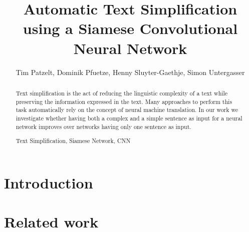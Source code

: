 \documentclass[runningheads,a4paper]{llncs}
\newcommand{\keywords}[1]{\par\addvspace\baselineskip
\noindent\keywordname\enspace\ignorespaces#1}
\begin{document}
\mainmatter  %

\title{Automatic Text Simplification using a Siamese Convolutional Neural Network}


%
\author{Tim Patzelt, Dominik Pfuetze, Henny Sluyter-Gaethje, Simon Untergasser%
}
%


%
%

\maketitle


\begin{abstract}
Text simplification is the act of reducing the linguistic complexity of a text while preserving the information expressed in the text. Many approaches to perform this task
automatically rely on the concept of neural machine translation. In our work we investigate whether having both a complex and a simple sentence as input for a neural network improves over networks having only one sentence as input. 

\keywords{Text Simplification, Siamese Network, CNN}
\end{abstract}


\section{Introduction}
\section{Related work}
\end{document}
